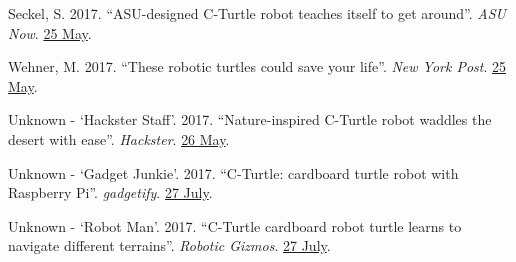 \documentclass[12pt,a4paper]{article}
\begin{document}
\begin{description}
			\item Seckel, S. 2017. ``ASU-designed C-Turtle robot teaches itself to get around''. \textit{ASU Now}. \href{https://asunow.asu.edu/20170525-solutions-asu-designed-c-turtle-robot-teaches-itself-get-around}{25 May}.
			\item Wehner, M. 2017. ``These robotic turtles could save your life''. \textit{New York Post}. \href{https://nypost.com/2017/05/25/these-robotic-turtles-could-save-your-life/}{25 May}.
			\item Unknown - `Hackster Staff'. 2017. ``Nature-inspired C-Turtle robot waddles the desert with ease''. \textit{Hackster}. \href{https://blog.hackster.io/nature-inspired-c-turtle-robot-waddles-the-desert-with-ease-3061cbc19b36}{26 May}.
			\item Unknown - `Gadget Junkie'. 2017. ``C-Turtle: cardboard turtle robot with Raspberry Pi''. \textit{gadgetify}. \href{http://www.gadgetify.com/c-turtle-cardboard-turtle-robot/}{27 July}.
			\item Unknown - `Robot Man'. 2017. ``C-Turtle cardboard robot turtle learns to navigate different terrains''. \textit{Robotic Gizmos}. \href{http://www.roboticgizmos.com/c-turtle-robot-turtle/}{27 July}.
		\end{description}
\end{document}
